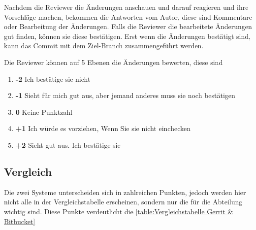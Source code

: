 Nachdem die Reviewer die Änderungen anschauen und darauf reagieren und ihre Vorschläge machen, bekommen die Antworten vom Autor, diese sind Kommentare oder Bearbeitung der Änderungen. Falls die Reviewer die bearbeitete Änderungen gut finden, können sie diese bestätigen. Erst wenn die Änderungen bestätigt sind, kann das Commit mit dem Ziel-Branch zusammengeführt werden.

Die Reviewer können auf 5 Ebenen die Änderungen bewerten, diese sind
\begin{enumerate}
	\item \textbf{-2} Ich bestätige sie nicht
	\item \textbf{-1} Sieht für mich gut aus, aber jemand anderes muss sie noch bestätigen
	\item \textbf{0}  Keine Punktzahl
	\item \textbf{+1} Ich würde es vorziehen, Wenn Sie sie nicht einchecken
	\item \textbf{+2} Sieht gut aus. Ich bestätige sie
\end{enumerate}

\subsection{Vergleich}
\label{subsec:Vergleich_Bitbucket_Gerrit}

Die zwei Systeme unterscheiden sich in zahlreichen Punkten, jedoch werden hier nicht alle in der Vergleichstabelle erscheinen, sondern nur die für die Abteilung wichtig sind. Diese Punkte verdeutlicht die \cref{table:Vergleichstabelle Gerrit & Bitbucket}

